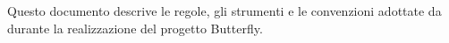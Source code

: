 Questo documento descrive le regole, gli strumenti e le convenzioni adottate da \gruppo durante la realizzazione del progetto Butterfly.